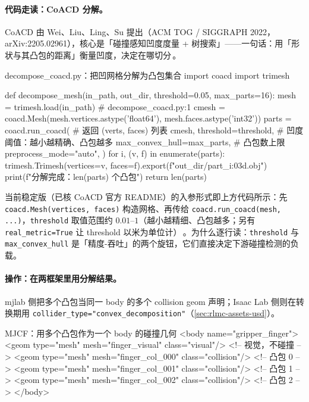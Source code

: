\paragraph{代码走读：CoACD 分解。}CoACD 由 Wei、Liu、Ling、Su 提出（ACM TOG / SIGGRAPH 2022，arXiv:2205.02961），核心是「碰撞感知凹度度量 + 树搜索」——一句话：用「形状与其凸包的距离」衡量凹度，决定在哪切分\,\cite{wei2022coacd}。

\begin{codebox}[Python]{decompose\_coacd.py：把凹网格分解为凸包集合}
import coacd
import trimesh

def decompose_mesh(in_path, out_dir, threshold=0.05, max_parts=16):
    mesh = trimesh.load(in_path)                         # decompose_coacd.py:1
    cmesh = coacd.Mesh(mesh.vertices.astype('float64'),
                       mesh.faces.astype('int32'))
    parts = coacd.run_coacd(                              # 返回 (verts, faces) 列表
        cmesh,
        threshold=threshold,        # 凹度阈值：越小越精确、凸包越多
        max_convex_hull=max_parts,  # 凸包数上限
        preprocess_mode="auto",
    )
    for i, (v, f) in enumerate(parts):
        trimesh.Trimesh(vertices=v, faces=f).export(f"{out_dir}/part_{i:03d}.obj")
    print(f"分解完成：{len(parts)} 个凸包")
    return len(parts)
\end{codebox}

当前稳定版（已核 CoACD 官方 README）的入参形式即上方代码所示：先 \texttt{coacd.Mesh(vertices, faces)} 构造网格、再传给 \texttt{coacd.run\_coacd(mesh, ...)}，\texttt{threshold} 取值范围约 $0.01$--$1$（越小越精细、凸包越多；另有 \texttt{real\_metric=True} 让 threshold 以米为单位计）\,\cite{wei2022coacd}。为什么逐行读：\texttt{threshold} 与 \texttt{max\_convex\_hull} 是「精度-吞吐」的两个旋钮，它们直接决定下游碰撞检测的负载。

\paragraph{操作：在两框架里用分解结果。}mjlab 侧把多个凸包当同一 body 的多个 collision geom 声明；Isaac Lab 侧则在转换期用 \texttt{collider\_type="convex\_decomposition"}（\cref{sec:rlmc-assets-usd}）。

\begin{codebox}[text]{MJCF：用多个凸包作为一个 body 的碰撞几何}
<body name="gripper_finger">
  <geom type="mesh" mesh="finger_visual" class="visual"/>      <!-- 视觉，不碰撞 -->
  <geom type="mesh" mesh="finger_col_000" class="collision"/>  <!-- 凸包 0 -->
  <geom type="mesh" mesh="finger_col_001" class="collision"/>  <!-- 凸包 1 -->
  <geom type="mesh" mesh="finger_col_002" class="collision"/>  <!-- 凸包 2 -->
</body>
\end{codebox}

